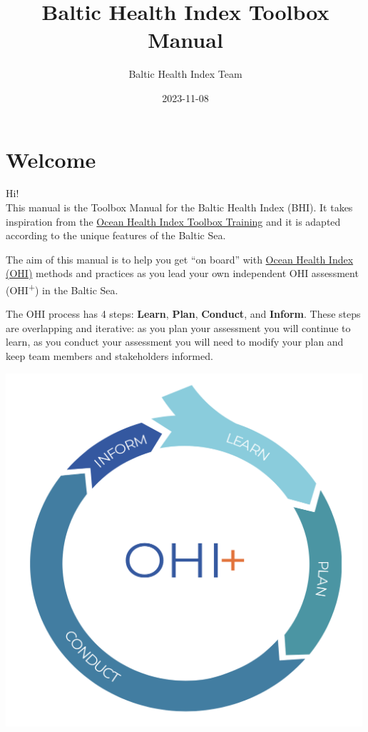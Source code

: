 \documentclass[
]{book}
\title{Baltic Health Index Toolbox Manual}
\author{Baltic Health Index Team}
\date{2023-11-08}
\begin{document}
\maketitle

{
\setcounter{tocdepth}{1}
\tableofcontents
}
\hypertarget{welcome}{%
\chapter{Welcome}\label{welcome}}

Hi! \\
This manual is the Toolbox Manual for the Baltic Health Index (BHI).
It takes inspiration from the \href{http://ohi-science.org/toolbox-training/}{Ocean Health Index Toolbox Training} and it is adapted according to the unique features of the Baltic Sea.

The aim of this manual is to help you get ``on board'' with \href{http://ohi-science.org}{Ocean Health Index (OHI)} methods and practices as you lead your own independent OHI assessment (OHI\textsuperscript{+}) in the Baltic Sea.

The OHI process has 4 steps: \textbf{Learn}, \textbf{Plan}, \textbf{Conduct}, and \textbf{Inform}. These steps are overlapping and iterative: as you plan your assessment you will continue to learn, as you conduct your assessment you will need to modify your plan and keep team members and stakeholders informed.

\begin{center}\includegraphics[width=500px]{_book/_main_files/figure-html/ohi-process} \end{center}
\end{document}
